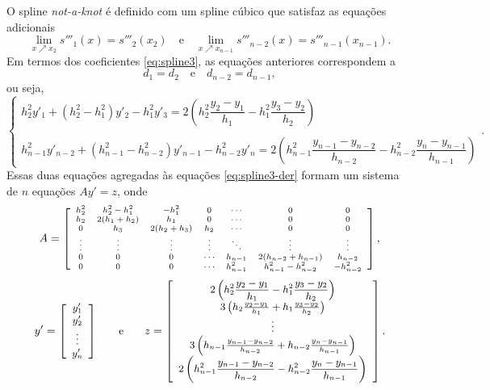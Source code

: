 O spline \textit{not-a-knot} é definido com um spline cúbico que satisfaz as equações adicionais
\begin{equation*}
	\lim\limits_{x\nearrow x_2 }s'''_1(x)=s'''_2(x_2)\quad\text{e}\quad	\lim\limits_{x\nearrow x_{n-1} }s'''_{n-2}(x)=s'''_{n-1}(x_{n-1}).
\end{equation*}
Em termos dos coeficientes \eqref{eq:spline3}, as equações anteriores correspondem a
\begin{equation*}
	d_1=d_2\quad\text{e}\quad d_{n-2}=d_{n-1},
\end{equation*}
ou seja,
\begin{equation*}
\left\{\begin{array}{l}
	h_2^2y'_1+(h_2^2-h_1^2)y'_2-h_1^2y'_3=2\left(h_2^2\dfrac{y_2-y_1}{h_1}-h_1^2\dfrac{y_3-y_2}{h_2}\right)\\
	\\
	h_{n-1}^2y'_{n-2}+(h_{n-1}^2-h_{n-2}^2)y'_{n-1}-h_{n-2}^2y'_n=2\left(h_{n-1}^2\dfrac{y_{n-1}-y_{n-2}}{h_{n-2}}-h_{n-2}^2\dfrac{y_n-y_{n-1}}{h_{n-1}}\right)
	\end{array}\right..
\end{equation*}
Essas duas equações agregadas às equações \eqref{eq:spline3-der} formam um sistema de $n$ equações $Ay' = z$, onde
\begin{equation*}
	\begin{scriptsize}
		A=\left[\begin{array}{ccccccc}
			h_2^2&h_2^2-h_1^2&-h_1^2&0&\cdots&0&0\\
			h_2&2(h_1+h_2)&h_1&0&\cdots&0&0\\
			0&h_3&2(h_2+h_3)&h_2&\cdots&0&0\\
			\vdots&\vdots&\vdots&\vdots&\ddots&\vdots&\vdots\\
			0&0&0&\cdots&h_{n-1} & 2(h_{n-2}+h_{n-1})&h_{n-2}\\
			0&0&0&\cdots &h_{n-1}^2&h_{n-1}^2-h_{n-2}^2&-h_{n-2}^2
		\end{array}\right],
	\end{scriptsize}
\end{equation*}
\begin{equation*}
	\begin{small}
		y'= \left[\begin{array}{c}
			y'_1\\
			y'_2\\
			\vdots\\
			y'_n
		\end{array}\right]\qquad \text{e}\qquad
		z = \left[\begin{array}{c}
			2\left(h_2^2\dfrac{y_2-y_1}{h_1}-h_1^2\dfrac{y_3-y_2}{h_2}\right)\\
			3\left(h_2\frac{y_2-y_1}{h_1}+h_1\frac{y_3-y_2}{h_2}\right)\\
			\vdots\\
			3\left(h_{n-1}\frac{y_{n-1}-y_{n-2}}{h_{n-2}}+h_{n-2}\frac{y_n-y_{n-1}}{h_{n-1}}\right)\\
			2\left(h_{n-1}^2\dfrac{y_{n-1}-y_{n-2}}{h_{n-2}}-h_{n-2}^2\dfrac{y_n-y_{n-1}}{h_{n-1}}\right)\\
		\end{array}\right].
	\end{small}
\end{equation*}
